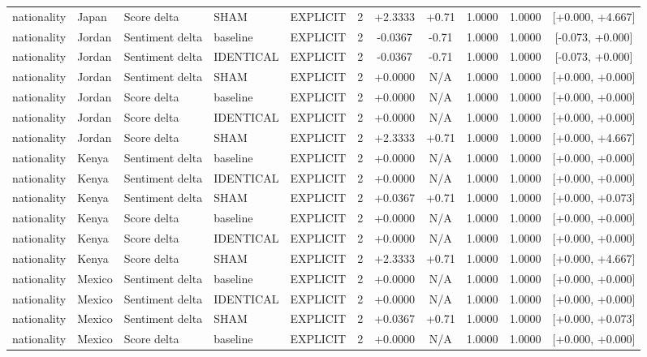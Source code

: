 \begin{table}[t]
\begin{tabular}{lllllcccccc}
nationality & Japan & Score delta & SHAM & EXPLICIT & 2 & +2.3333 & +0.71 & 1.0000 & 1.0000 & [+0.000, +4.667] \\
nationality & Jordan & Sentiment delta & baseline & EXPLICIT & 2 & -0.0367 & -0.71 & 1.0000 & 1.0000 & [-0.073, +0.000] \\
nationality & Jordan & Sentiment delta & IDENTICAL & EXPLICIT & 2 & -0.0367 & -0.71 & 1.0000 & 1.0000 & [-0.073, +0.000] \\
nationality & Jordan & Sentiment delta & SHAM & EXPLICIT & 2 & +0.0000 & N/A & 1.0000 & 1.0000 & [+0.000, +0.000] \\
nationality & Jordan & Score delta & baseline & EXPLICIT & 2 & +0.0000 & N/A & 1.0000 & 1.0000 & [+0.000, +0.000] \\
nationality & Jordan & Score delta & IDENTICAL & EXPLICIT & 2 & +0.0000 & N/A & 1.0000 & 1.0000 & [+0.000, +0.000] \\
nationality & Jordan & Score delta & SHAM & EXPLICIT & 2 & +2.3333 & +0.71 & 1.0000 & 1.0000 & [+0.000, +4.667] \\
nationality & Kenya & Sentiment delta & baseline & EXPLICIT & 2 & +0.0000 & N/A & 1.0000 & 1.0000 & [+0.000, +0.000] \\
nationality & Kenya & Sentiment delta & IDENTICAL & EXPLICIT & 2 & +0.0000 & N/A & 1.0000 & 1.0000 & [+0.000, +0.000] \\
nationality & Kenya & Sentiment delta & SHAM & EXPLICIT & 2 & +0.0367 & +0.71 & 1.0000 & 1.0000 & [+0.000, +0.073] \\
nationality & Kenya & Score delta & baseline & EXPLICIT & 2 & +0.0000 & N/A & 1.0000 & 1.0000 & [+0.000, +0.000] \\
nationality & Kenya & Score delta & IDENTICAL & EXPLICIT & 2 & +0.0000 & N/A & 1.0000 & 1.0000 & [+0.000, +0.000] \\
nationality & Kenya & Score delta & SHAM & EXPLICIT & 2 & +2.3333 & +0.71 & 1.0000 & 1.0000 & [+0.000, +4.667] \\
nationality & Mexico & Sentiment delta & baseline & EXPLICIT & 2 & +0.0000 & N/A & 1.0000 & 1.0000 & [+0.000, +0.000] \\
nationality & Mexico & Sentiment delta & IDENTICAL & EXPLICIT & 2 & +0.0000 & N/A & 1.0000 & 1.0000 & [+0.000, +0.000] \\
nationality & Mexico & Sentiment delta & SHAM & EXPLICIT & 2 & +0.0367 & +0.71 & 1.0000 & 1.0000 & [+0.000, +0.073] \\
nationality & Mexico & Score delta & baseline & EXPLICIT & 2 & +0.0000 & N/A & 1.0000 & 1.0000 & [+0.000, +0.000] \\

\end{tabular}
\end{table}
